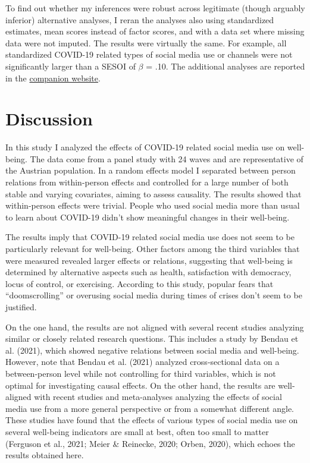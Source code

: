 \documentclass[
  english,
  man,mask,floatsintext]{apa6}
\begin{document}
To find out whether my inferences were robust across legitimate (though arguably inferior) alternative analyses, I reran the analyses also using standardized estimates, mean scores instead of factor scores, and with a data set where missing data were not imputed.
The results were virtually the same.
For example, all standardized COVID-19 related types of social media use or channels were not significantly larger than a SESOI of \(\beta\) = \textbar.10\textbar.
The additional analyses are reported in the \href{https://tdienlin.github.io/Austrian_Corona_Panel/analyses_additional.html}{companion website}.

\hypertarget{discussion}{%
\section{Discussion}\label{discussion}}

In this study I analyzed the effects of COVID-19 related social media use on well-being.
The data come from a panel study with 24 waves and are representative of the Austrian population.
In a random effects model I separated between person relations from within-person effects and controlled for a large number of both stable and varying covariates, aiming to assess causality.
The results showed that within-person effects were trivial.
People who used social media more than usual to learn about COVID-19 didn't show meaningful changes in their well-being.

The results imply that COVID-19 related social media use does not seem to be particularly relevant for well-being.
Other factors among the third variables that were measured revealed larger effects or relations, suggesting that well-being is determined by alternative aspects such as health, satisfaction with democracy, locus of control, or exercising.
According to this study, popular fears that ``doomscrolling'' or overusing social media during times of crises don't seem to be justified.

On the one hand, the results are not aligned with several recent studies analyzing similar or closely related research questions.
This includes a study by Bendau et al. (2021), which showed negative relations between social media and well-being.
However, note that Bendau et al. (2021) analyzed cross-sectional data on a between-person level while not controlling for third variables, which is not optimal for investigating causal effects.
On the other hand, the results are well-aligned with recent studies and meta-analyses analyzing the effects of social media use from a more general perspective or from a somewhat different angle.
These studies have found that the effects of various types of social media use on several well-being indicators are small at best, often too small to matter (Ferguson et al., 2021; Meier \& Reinecke, 2020; Orben, 2020), which echoes the results obtained here.
\end{document}
